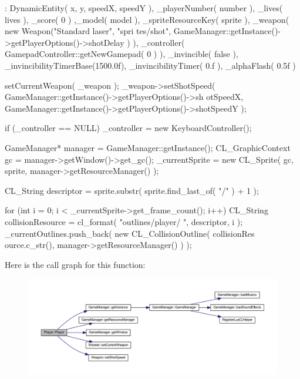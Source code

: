 \begin{DoxyCode}
        : DynamicEntity( x, y, speedX, speedY ), _playerNumber( number ), _lives(
       lives ), _score( 0 ) ,_model( model ),
        _spriteResourceKey( sprite ), _weapon( new Weapon("Standard laser", "spri
      tes/shot", GameManager::getInstance()->getPlayerOptions()->shotDelay ) ),
        _controller( GamepadController::getNewGamepad( 0 ) ), _invincible( false 
      ), _invincibilityTimerBase(1500.0f),
        _invincibilityTimer( 0.f ), _alphaFlash( 0.5f )
{
        setCurrentWeapon( _weapon );
        _weapon->setShotSpeed( GameManager::getInstance()->getPlayerOptions()->sh
      otSpeedX,
                GameManager::getInstance()->getPlayerOptions()->shotSpeedY );

        if (_controller == NULL)
        {
                _controller = new KeyboardController();
        }

        GameManager* manager = GameManager::getInstance();
        CL_GraphicContext gc = manager->getWindow()->get_gc();
        _currentSprite = new CL_Sprite( gc, sprite, manager->getResourceManager()
       );

        CL_String descriptor = sprite.substr( sprite.find_last_of( "/" ) + 1 );

        for (int i = 0; i < _currentSprite->get_frame_count(); i++)
        {
                CL_String collisionResource = cl_format( "outlines/player/%
      ", descriptor, i );
                _currentOutlines.push_back( new CL_CollisionOutline( collisionRes
      ource.c_str(), manager->getResourceManager() ) );
        }

}
\end{DoxyCode}


Here is the call graph for this function:
\nopagebreak
\begin{figure}[H]
\begin{center}
\leavevmode
\includegraphics[width=400pt]{d8/d53/class_player_a28f6d1f3509fc57c77784b1d540c0dbf_cgraph}
\end{center}
\end{figure}


